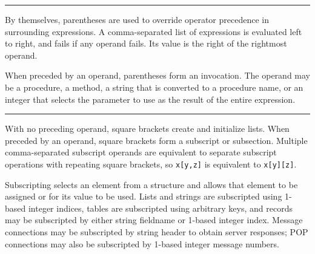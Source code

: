\bigskip\hrule\vspace{0.1cm}


\noindent
By themselves, parentheses are used
to override operator precedence in surrounding expressions. A
comma-separated list of expressions is evaluated left to right, and
fails if any operand fails. Its value is the right of the rightmost
operand.

When preceded by an operand, parentheses form an invocation. The operand may be a procedure, a method, a
string that is converted to a procedure name, or an integer that
selects the parameter to use as the result of the entire expression.

\bigskip\hrule\vspace{0.1cm}







\noindent
With no preceding operand, square brackets create and initialize lists.
When preceded by an operand, square brackets form a subscript or
subsection. Multiple comma-separated subscript operands are equivalent
to separate subscript operations with repeating square brackets, so
\texttt{x[y,z]} is equivalent to \texttt{x[y][z]}.

Subscripting selects an element from a structure and allows that element
to be assigned or for its value to be used. Lists and strings are
subscripted using 1-based integer indices, tables are subscripted using
arbitrary keys, and records may be subscripted by either string
fieldname or 1-based integer index. Message connections may be
subscripted by string header to obtain server responses; POP
connections may also be subscripted by 1-based integer message numbers.

